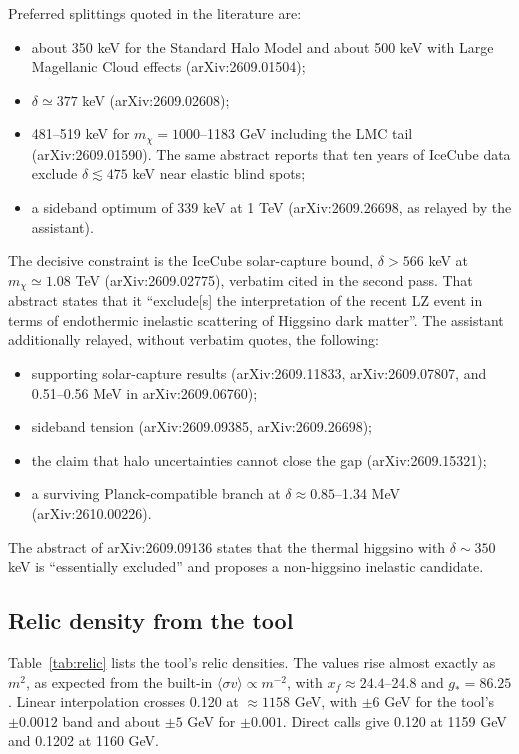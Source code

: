 \documentclass[11pt,a4paper]{article}
\begin{document}
Preferred splittings quoted in the literature are:
\begin{itemize}
\item about 350 keV for the Standard Halo Model and about 500 keV with Large Magellanic Cloud effects (arXiv:2609.01504);
\item $\delta\simeq377$ keV (arXiv:2609.02608);
\item 481--519 keV for $m_\chi=1000$--1183 GeV including the LMC tail (arXiv:2609.01590). The same abstract reports that ten years of IceCube data exclude $\delta\lesssim475$ keV near elastic blind spots;
\item a sideband optimum of 339 keV at 1 TeV (arXiv:2609.26698, as relayed by the assistant).
\end{itemize}

The decisive constraint is the IceCube solar-capture bound, $\delta>566$ keV at $m_\chi\simeq1.08$ TeV (arXiv:2609.02775), verbatim cited in the second pass. That abstract states that it ``exclude[s] the interpretation of the recent LZ event in terms of endothermic inelastic scattering of Higgsino dark matter''. The assistant additionally relayed, without verbatim quotes, the following:
\begin{itemize}
\item supporting solar-capture results (arXiv:2609.11833, arXiv:2609.07807, and 0.51--0.56 MeV in arXiv:2609.06760);
\item sideband tension (arXiv:2609.09385, arXiv:2609.26698);
\item the claim that halo uncertainties cannot close the gap (arXiv:2609.15321);
\item a surviving Planck-compatible branch at $\delta\approx0.85$--1.34 MeV (arXiv:2610.00226).
\end{itemize}
The abstract of arXiv:2609.09136 states that the thermal higgsino with $\delta\sim350$ keV is ``essentially excluded'' and proposes a non-higgsino inelastic candidate.

\subsection{Relic density from the tool}
Table~\ref{tab:relic} lists the tool's relic densities. The values rise almost exactly as $m^2$, as expected from the built-in $\langle\sigma v\rangle\propto m^{-2}$, with $x_f\approx24.4$--24.8 and $g_*=86.25$. Linear interpolation crosses 0.120 at $\approx1158$ GeV, with $\pm6$ GeV for the tool's $\pm0.0012$ band and about $\pm5$ GeV for $\pm0.001$. Direct calls give 0.120 at 1159 GeV and 0.1202 at 1160 GeV.
\end{document}
